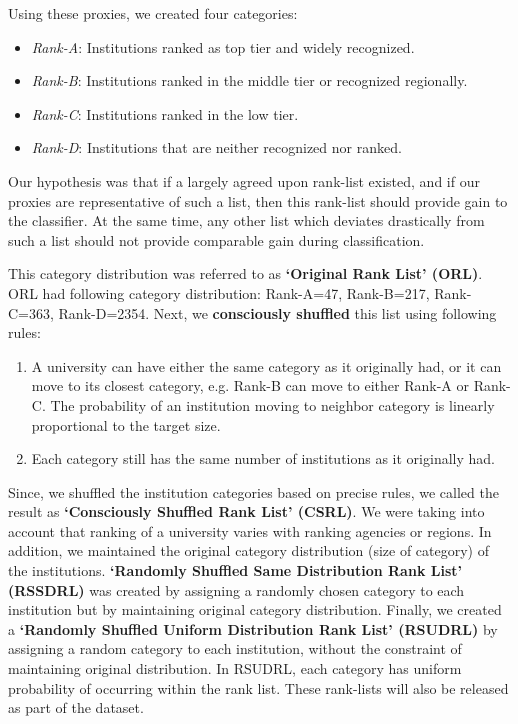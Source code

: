 \documentclass{sig-alternate-05-2015}
\begin{document}
Using these proxies, we created four categories:
\begin{itemize}
\item \textit{Rank-A}: Institutions ranked as top tier and widely recognized.
\item \textit{Rank-B}: Institutions ranked in the middle tier or recognized regionally.
\item \textit{Rank-C}: Institutions ranked in the low tier.
\item \textit{Rank-D}: Institutions that are neither recognized nor ranked.
\end{itemize}

Our hypothesis was that if a largely agreed upon rank-list existed, and if our proxies are representative of such a list, then this rank-list should provide gain to the classifier. At the same time, any other list which deviates drastically from such a list should not provide comparable gain during classification.

This category distribution was referred to as \textbf{`Original Rank List' (ORL)}. ORL had following category distribution: Rank-A=47, Rank-B=217, Rank-C=363, Rank-D=2354. Next, we \textbf{consciously shuffled} this list using following rules:
\begin{enumerate}
\item A university can have either the same category as it originally had, or it can move to its closest category, e.g. Rank-B can move to either Rank-A or Rank-C. The probability of an institution moving to neighbor category is linearly proportional to the target size.
\item Each category still has the same number of institutions as it originally had.
\end{enumerate}

Since, we shuffled the institution categories based on precise rules, we called the result as \textbf{`Consciously Shuffled Rank List' (CSRL)}. We were taking into account that ranking of a university varies with ranking agencies or regions. In addition, we maintained the original category distribution (size of category) of the institutions. \textbf{`Randomly Shuffled Same Distribution Rank List' (RSSDRL)} was created by assigning a randomly chosen category to each institution but by maintaining original category distribution. Finally, we created a \textbf{`Randomly Shuffled Uniform Distribution Rank List' (RSUDRL)} by assigning a random category to each institution, without the constraint of maintaining original distribution. In RSUDRL, each category has uniform probability of occurring within the rank list. These rank-lists will also be released as part of the dataset.
\end{document}
